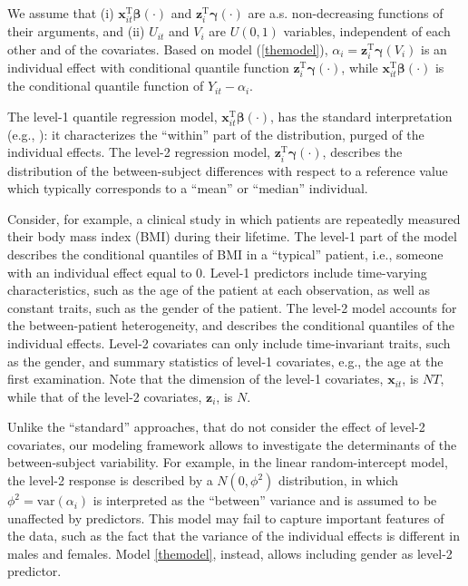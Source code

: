\documentclass[12pt]{article}
\def\T{{ \mathrm{\scriptscriptstyle T} }}
\def\betavec{\bm{\beta}}
\def\gammavec{\bm{\gamma}}
\def\xx{\bm{x}}
\def\zz{\bm{z}}
\begin{document}
We assume that (i) $\xx_{it}^\T\betavec(\cdot)$ and $\zz_{i}^\T\gammavec(\cdot)$ are a.s. non-decreasing functions of their arguments, and
(ii) $U_{it}$ and $V_i$ are $U(0,1)$ variables, independent of each other and of the covariates.
Based on model (\ref{themodel}), $\alpha_i = \zz_{i}^\T\gammavec(V_{i})$ is an individual effect with 
conditional quantile function $\zz_{i}^\T\gammavec(\cdot)$, while $\xx_{it}^\T\betavec(\cdot)$ is the conditional 
quantile function of $Y_{it} - \alpha_i$. 

The level-1 quantile regression model, $\xx_{it}^\T\betavec(\cdot)$, has the standard interpretation 
(e.g., \citealp{koenker2004}): it characterizes the ``within'' part of the 
distribution, purged of the individual effects.
The level-2 regression model, $\zz_{i}^\T\gammavec(\cdot)$,
describes the distribution of the between-subject differences with respect to a reference value
which typically corresponds to a ``mean'' or ``median'' individual.


Consider, for example, a clinical study in which patients are 
repeatedly measured their body mass index (BMI) during their lifetime.
The level-1 part of the model describes the conditional quantiles of BMI in a ``typical''
patient, i.e., someone with an individual effect equal to $0$.
Level-1 predictors include time-varying characteristics, such as the age of the patient at each observation,
as well as constant traits, such as the gender of the patient.
The level-2 model accounts for the between-patient heterogeneity, and describes the 
conditional quantiles of the individual effects. Level-2 covariates 
can only include time-invariant traits, such as the gender,
and summary statistics of level-1 covariates, e.g., the age at the first examination.
Note that the dimension of the level-1 covariates, $\xx_{it}$,
is $NT$, while that of the level-2 covariates, $\zz_i$, is $N$.



Unlike the ``standard'' approaches, that do not consider the effect of level-2 covariates, 
our modeling framework allows to investigate the determinants of the between-subject variability.
For example, in the linear random-intercept model, the level-2 response is described by a $N(0, \phi^2)$ distribution,
in which $\phi^2 = \text{var}(\alpha_i)$ is interpreted as the ``between'' variance and 
is assumed to be unaffected by predictors. This model may fail to capture important features of the data,
such as the fact that the variance of the individual effects is different in males and females. 
Model \eqref{themodel}, instead, allows including gender as level-2 predictor.
\end{document}
